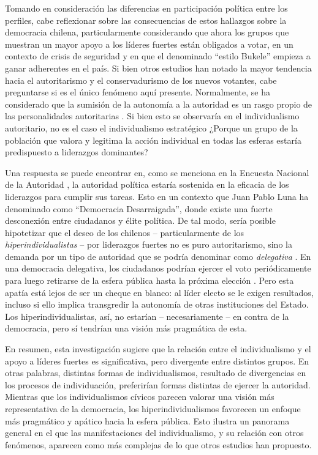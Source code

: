 \documentclass[12pt,oneside]{templates/facsothesis}
\begin{document}
Tomando en consideración las diferencias en participación política entre los perfiles, cabe reflexionar sobre las consecuencias de estos hallazgos sobre la democracia chilena, particularmente considerando que ahora los grupos que muestran un mayor apoyo a los líderes fuertes están obligados a votar, en un contexto de crisis de seguridad y en que el denominado ``estilo Bukele'' empieza a ganar adherentes en el país. Si bien otros estudios \citep{coes2023} han notado la mayor tendencia hacia el autoritarismo y el conservadurismo de los nuevos votantes, cabe preguntarse si es el único fenómeno aquí presente. Normalmente, se ha considerado que la sumisión de la autonomía a la autoridad es un rasgo propio de las personalidades autoritarias \citep{zakrisson2005}. Si bien esto se observaría en el individualismo autoritario, no es el caso el individualismo estratégico ¿Porque un grupo de la población que valora y legitima la acción individual en todas las esferas estaría predispuesto a liderazgos dominantes?

Una respuesta se puede encontrar en, como se menciona en la Encuesta Nacional de la Autoridad \citep{araujo2022}, la autoridad política estaría sostenida en la eficacia de los liderazgos para cumplir sus tareas. Esto en un contexto que Juan Pablo Luna \citeyearpar{luna2016} ha denominado como ``Democracia Desarraigada'', donde existe una fuerte desconexión entre ciudadanos y élite política. De tal modo, sería posible hipotetizar que el deseo de los chilenos -- particularmente de los \emph{hiperindividualistas} -- por liderazgos fuertes no es puro autoritarismo, sino la demanda por un tipo de autoridad que se podría denominar como \emph{delegativa} \citep{odonnell1994}. En una democracia delegativa, los ciudadanos podrían ejercer el voto periódicamente para luego retirarse de la esfera pública hasta la próxima elección \citep{peruzzotti2008}. Pero esta apatía está lejos de ser un cheque en blanco: al líder electo se le exigen resultados, incluso si ello implica transgredir la autonomía de otras instituciones del Estado. Los hiperindividualistas, así, no estarían -- necesariamente -- en contra de la democracia, pero sí tendrían una visión más pragmática de esta.

En resumen, esta investigación sugiere que la relación entre el individualismo y el apoyo a líderes fuertes es significativa, pero divergente entre distintos grupos. En otras palabras, distintas formas de individualismos, resultado de divergencias en los procesos de individuación, preferirían formas distintas de ejercer la autoridad. Mientras que los individualismos cívicos parecen valorar una visión más representativa de la democracia, los hiperindividualismos favorecen un enfoque más pragmático y apático hacia la esfera pública. Esto ilustra un panorama general en el que las manifestaciones del individualismo, y su relación con otros fenómenos, aparecen como más complejas de lo que otros estudios han propuesto.
\end{document}

